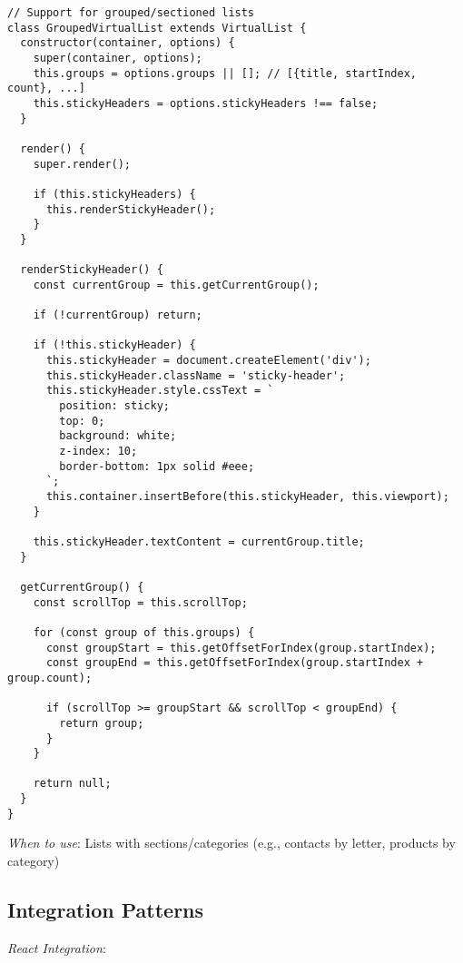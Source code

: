 \documentclass[11pt]{article}
\begin{document}
\begin{verbatim}
// Support for grouped/sectioned lists
class GroupedVirtualList extends VirtualList {
  constructor(container, options) {
    super(container, options);
    this.groups = options.groups || []; // [{title, startIndex, count}, ...]
    this.stickyHeaders = options.stickyHeaders !== false;
  }
  
  render() {
    super.render();
    
    if (this.stickyHeaders) {
      this.renderStickyHeader();
    }
  }
  
  renderStickyHeader() {
    const currentGroup = this.getCurrentGroup();
    
    if (!currentGroup) return;
    
    if (!this.stickyHeader) {
      this.stickyHeader = document.createElement('div');
      this.stickyHeader.className = 'sticky-header';
      this.stickyHeader.style.cssText = `
        position: sticky;
        top: 0;
        background: white;
        z-index: 10;
        border-bottom: 1px solid #eee;
      `;
      this.container.insertBefore(this.stickyHeader, this.viewport);
    }
    
    this.stickyHeader.textContent = currentGroup.title;
  }
  
  getCurrentGroup() {
    const scrollTop = this.scrollTop;
    
    for (const group of this.groups) {
      const groupStart = this.getOffsetForIndex(group.startIndex);
      const groupEnd = this.getOffsetForIndex(group.startIndex + group.count);
      
      if (scrollTop >= groupStart && scrollTop < groupEnd) {
        return group;
      }
    }
    
    return null;
  }
}
\end{verbatim}

\emph{When to use}: Lists with sections/categories (e.g., contacts by letter, products by category)
\subsection{Integration Patterns}
\label{sec:org1dcb277}

\emph{React Integration}:
\end{document}
